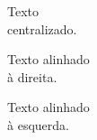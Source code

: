 \documentclass[a4paper,12pt]{article}
\begin{document}
	\centering
	Texto\\centralizado.
	
	\raggedleft
	Texto alinhado\\à direita.	
	
	\raggedright
	Texto alinhado\\à esquerda.
	
	
\end{document}
